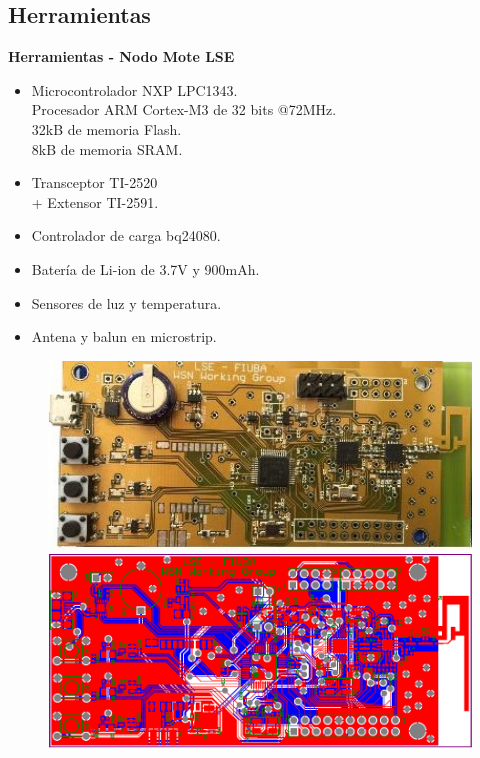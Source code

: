 \documentclass[aspectratio=43, handout]{beamer}
\begin{document}
\subsection[Herramientas]{Herramientas}
\begin{frame}{\textbf{\LARGE{Herramientas - Nodo Mote LSE}}}

\begin{minipage}[c]{1.0\linewidth}
	\begin{minipage}[c]{0.6\linewidth}
\begin{itemize}
\item Microcontrolador NXP LPC1343.\\
Procesador ARM Cortex-M3 de 32 bits @72MHz.\\
32kB de memoria Flash.\\
8kB de memoria SRAM.\\
\item Transceptor TI-2520\\+ Extensor TI-2591.
\item Controlador de carga bq24080.
\item Batería de Li-ion de 3.7V y 900mAh.
\item Sensores de luz y temperatura.
\item Antena y balun en microstrip.
\end{itemize}
	\end{minipage}
	\begin{minipage}[c]{0.35\linewidth}
		\begin{figure}[H]
			\vspace{35px}
			\includegraphics[width=1.2\textwidth]{./imagenes/mote.jpg}
			\\
			\vspace{10px}
			\includegraphics[width=1.2\textwidth]{./imagenes/motePCB}

\end{figure}
\end{minipage}
\end{minipage}
\end{frame}
\end{document}
